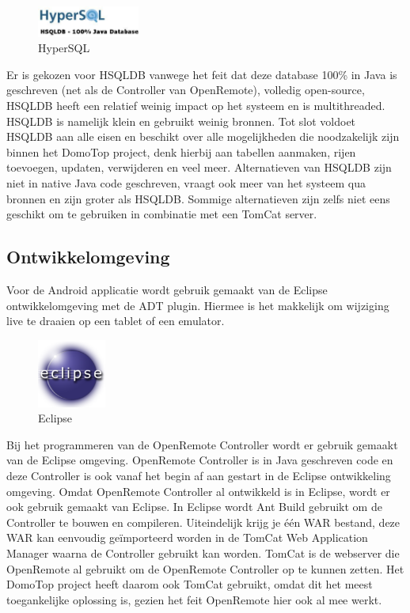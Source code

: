 \documentclass[]{article}
\begin{document}
\begin{figure}
  \begin{center}
    \includegraphics[width=0.30\textwidth]{hsql.pdf}
  \end{center}
  \caption{HyperSQL}
\end{figure}

Er is gekozen voor HSQLDB vanwege het feit dat deze database 100\% in Java
is geschreven (net als de Controller van OpenRemote), volledig open-source,
HSQLDB heeft een relatief weinig impact op het systeem en is multithreaded.
HSQLDB is namelijk klein en gebruikt weinig bronnen. Tot slot voldoet
HSQLDB aan alle eisen en beschikt over alle mogelijkheden die noodzakelijk
zijn binnen het DomoTop project, denk hierbij aan tabellen aanmaken, rijen
toevoegen, updaten, verwijderen en veel meer. Alternatieven van HSQLDB zijn
niet in native Java code geschreven,  vraagt ook meer van het systeem qua
bronnen en zijn groter als HSQLDB. Sommige alternatieven zijn zelfs niet
eens geschikt om te gebruiken in combinatie met een TomCat server.

\subsection{Ontwikkelomgeving}
Voor de Android applicatie wordt gebruik gemaakt van de Eclipse
ontwikkelomgeving met de ADT plugin. Hiermee is het makkelijk om wijziging
live te draaien op een tablet of een emulator.

\begin{figure}
  \begin{center}
    \includegraphics[width=0.20\textwidth]{eclipse.pdf}
  \end{center}
  \caption{Eclipse}
\end{figure}

Bij het programmeren van de OpenRemote Controller wordt er gebruik gemaakt
van de Eclipse omgeving. OpenRemote Controller is in Java geschreven code
en deze Controller is ook vanaf het begin af aan gestart in de Eclipse
ontwikkeling omgeving. Omdat OpenRemote Controller al ontwikkeld is in
Eclipse, wordt er ook gebruik gemaakt van Eclipse. In Eclipse wordt Ant
Build gebruikt om de Controller te bouwen en compileren. Uiteindelijk krijg
je één WAR bestand, deze WAR kan eenvoudig geïmporteerd worden in de TomCat
Web Application Manager waarna de Controller gebruikt kan worden. TomCat is
de webserver die OpenRemote al gebruikt om de OpenRemote Controller op te
kunnen zetten. Het DomoTop project heeft daarom ook TomCat gebruikt, omdat
dit het meest toegankelijke oplossing is, gezien het feit OpenRemote hier
ook al mee werkt.
\end{document}
